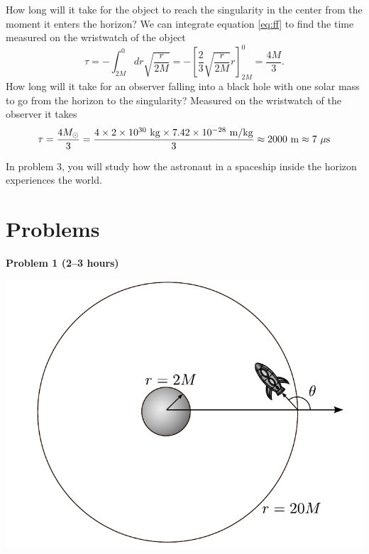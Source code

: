 \begin{multicols}{2}
How long will it take for the object to reach the singularity in the center from the moment it enters the horizon? We can integrate equation \ref{eq:ff} to find the time measured on the wristwatch of the object
\[
\tau=-\int_{2M}^0dr\sqrt{\frac{r}{2M}}=-\left[\frac{2}{3}\sqrt{\frac{r}{2M}}r\right]_{2M}^0=\frac{4M}{3}.
\]
How long will it take for an observer falling into a black hole with one solar mass to go from the horizon to the singularity? Measured on the wristwatch of the observer it takes
\[
\tau = \frac{4M_\odot}{3} =  \frac{4\times2\times10^{30}{\rm\ kg}\times7.42\times10^{-28}{\rm\ m/kg}}{3} \approx 2000{\rm\ m} \approx 7 {\rm\ \mu s}
\]

In problem 3, you will study how the astronaut in a spaceship inside the horizon experiences the world.

\newpage



\section{Problems}

{\bf Problem 1 (2--3 hours)}

\begin{Figure}
\centering
\includegraphics[width=\textwidth]{fig_17-9.pdf}
\end{Figure}



\end{multicols}
